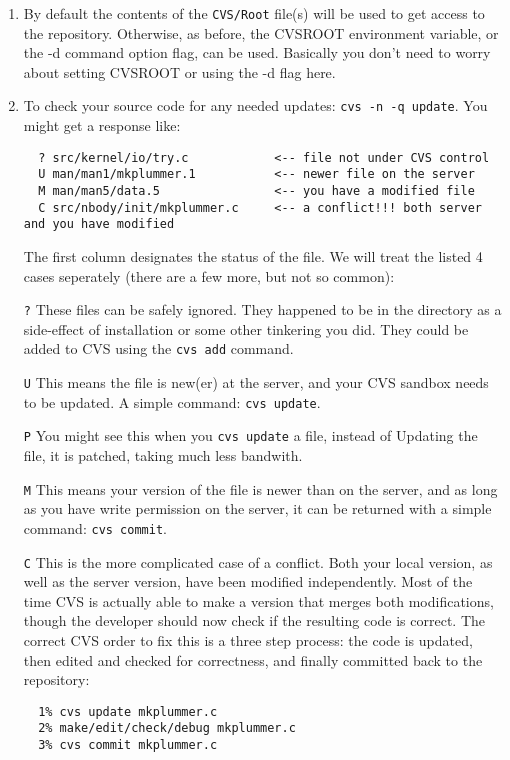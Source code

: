 \begin{enumerate}

\item By default the contents of the {\tt CVS/Root} file(s) will be used to
get access to the repository. Otherwise, as before, the CVSROOT environment
variable, or the -d command option flag, can be used. Basically you
don't need to worry about setting CVSROOT or using the -d flag here.

\item To check your source code for any needed updates: {\tt cvs -n -q update}.
You might get a response like:
\footnotesize\begin{verbatim}
  ? src/kernel/io/try.c            <-- file not under CVS control
  U man/man1/mkplummer.1           <-- newer file on the server
  M man/man5/data.5                <-- you have a modified file
  C src/nbody/init/mkplummer.c     <-- a conflict!!! both server and you have modified
\end{verbatim}\normalsize
The first column designates the status of the file. 
We will treat the listed 4 cases seperately (there are a few more, but not
so common):

\item[{\tt ?}] 
These files can be safely ignored. They happened to be in the directory
as a side-effect of installation or some other tinkering you did. They could
be added to CVS using the {\tt cvs add} command.

\item[{\tt U}] 
This means the file is new(er) at the server, and your
CVS sandbox needs to be updated. A simple command: {\tt cvs update}.

\item[{\tt P}] You might see this when you {\tt cvs update} a file, instead
of Updating the file, it is patched, taking much less bandwith.

\item[{\tt M}] This means your version of the file is newer than on
the server, 
and as long as you have write permission on the server, it can be returned
with a simple command: {\tt cvs commit}.

\item[{\tt C}] This is the more complicated case of a conflict. Both your local
version, as well as the server version, have been modified independently.
Most of the time CVS is actually able to make a version that merges both
modifications, though the developer should now check if the resulting code
is correct. The correct CVS order to fix this is a three step process: the
code is updated, then edited and checked for correctness, and finally
committed back to the repository:

\footnotesize\begin{verbatim}
  1% cvs update mkplummer.c
  2% make/edit/check/debug mkplummer.c
  3% cvs commit mkplummer.c
\end{verbatim}\normalsize


\end{enumerate}

